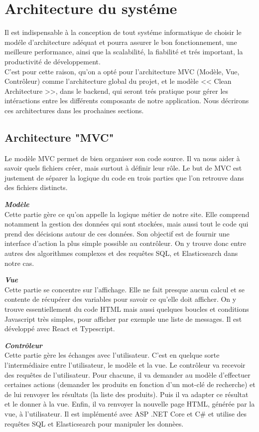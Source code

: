 \newpage
\section{Architecture du systéme}
\noindent
Il est indispensable à la conception de tout systéme informatique de choisir le modéle d'architecture adéquat et pourra assurer le bon fonctionnement, une meilleure performance, ainsi que la scalabilité, la fiabilité et trés important, la productivité de développement. \\
C'est pour cette raison, qu'on a opté pour l'architecture MVC (Modèle, Vue, Contrôleur) comme l'architecture global du projet, et le modèle << Clean Architecture >>, dans le backend, qui seront trés pratique pour gérer les intéractions entre les différents composants de notre application. Nous décrirons ces architectures dans les prochaines sections.

\subsection{Architecture "MVC"}
\noindent
Le modèle MVC permet de bien organiser son code source. Il va nous aider à savoir quels fichiers créer, mais surtout à définir leur rôle. Le but de MVC est justement de séparer la logique du code en trois parties que l'on retrouve dans des fichiers distincts.

\noindent
{\small\textbf{\textit{Modèle}}}\mbox{}\\
Cette partie gère ce qu'on appelle la logique métier de notre site. Elle comprend notamment la gestion des données qui sont stockées, mais aussi tout le code qui prend des décisions autour de ces données. Son objectif est de fournir une interface d'action la plus simple possible au contrôleur. On y trouve donc entre autres des algorithmes complexes et des requêtes SQL, et Elasticsearch dans notre cas.

\noindent
{\small\textbf{\textit{Vue}}}\mbox{}\\
Cette partie se concentre sur l'affichage. Elle ne fait presque aucun calcul et se contente de récupérer des variables pour savoir ce qu'elle doit afficher. On y trouve essentiellement du code HTML mais aussi quelques boucles et conditions Javascript très simples, pour afficher par exemple une liste de messages. Il est développé avec React et Typescript.

\newpage
\noindent
{\small\textbf{\textit{Contrôleur}}}\mbox{}\\
Cette partie gère les échanges avec l'utilisateur. C'est en quelque sorte l'intermédiaire entre l'utilisateur, le modèle et la vue. Le contrôleur va recevoir des requêtes de l'utilisateur. Pour chacune, il va demander au modèle d'effectuer certaines actions (demander les produits en fonction d'un mot-clé de recherche) et de lui renvoyer les résultats (la liste des produits). Puis il va adapter ce résultat et le donner à la vue. Enfin, il va renvoyer la nouvelle page HTML, générée par la vue, à l'utilisateur. Il est implémenté avec ASP .NET Core et C\# et utilise des requêtes SQL et Elasticsearch pour manipuler les donnèes.

